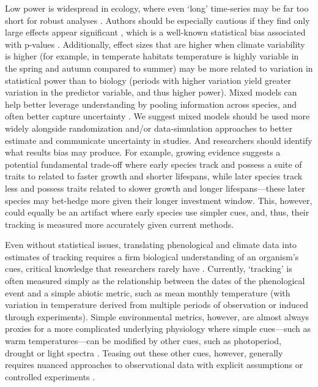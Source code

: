 \documentclass[11pt,letterpaper]{article}
\newcommand{\R}[1]{\label{#1}\linelabel{#1}}
\begin{document}
Low power is widespread in ecology, where even `long' time-series may be far too short for robust analyses \citep{bolmgren2013,kharouba2018}. Authors should be especially cautious if they find only large effects appear significant \citep[e.g.,][]{CaraDonna2014}, which is a well-known statistical bias associated with p-values \citep{loken2017}. Additionally, effect sizes that are higher when climate variability is higher (for example, in temperate habitats temperature is highly variable in the spring and autumn compared to summer) may be more related to variation in statistical power than to biology (periods with higher variation yield greater variation in the predictor variable, and thus higher power). Mixed models can help better leverage understanding by pooling information across species, and often better capture uncertainty \citep{pearse2017}. We suggest mixed models should be used more widely alongside randomization and/or data-simulation approaches \citep[e.g.,][]{bolmgren2013,kharouba2018} to better estimate and communicate uncertainty in studies. And researchers should identify what results bias may produce. For example, growing evidence suggests a potential fundamental trade-off where early species track and possess a suite of traits to related to faster growth and shorter lifespans, while later species track less and possess traits related to slower growth and longer lifespans---these later species may bet-hedge more given their longer investment window. This, however, could equally be an artifact where early species use simpler cues, and, thus, their tracking is measured more accurately given current methods.

Even without statistical issues, translating phenological and climate data into estimates of tracking requires a firm biological understanding of an organism's cues, critical knowledge that researchers rarely have \citep{chmura2019}. Currently, `tracking' is often measured simply as the relationship between the dates of the phenological event and a simple abiotic metric, such as mean monthly temperature (with variation in temperature derived from multiple periods of observation or induced through experiments). Simple environmental metrics, however, are almost always proxies for a more complicated underlying physiology where simple cues---such as warm temperatures---can be modified by other cues, such as photoperiod, drought or light spectra \citep{Bagnall1993,Stinchcombe:2004ec}. Teasing out these other cues, however, generally requires nuanced approaches to observational data with explicit assumptions \citep{tansey2017}\R{citetansey} or controlled experiments \citep{Wilczek:2009oa,Caffarra:2011qf}. 
\end{document}
